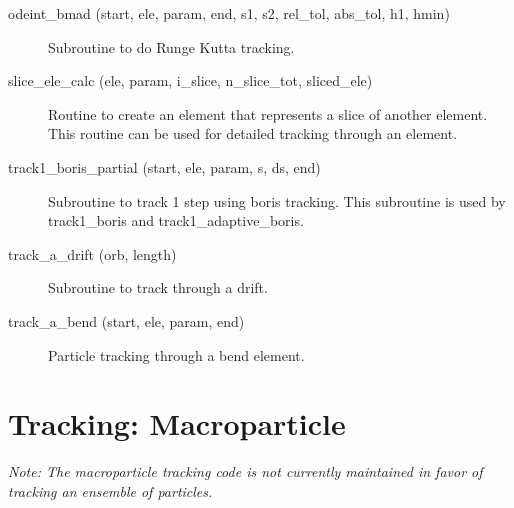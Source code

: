 \begin{description}

\label{r:odeint.bmad}
\item[odeint_bmad (start, ele, param, end, s1, s2, rel_tol, abs_tol, h1, hmin)] \Newline
Subroutine to do Runge Kutta tracking. 

\label{r:slice.ele.calc}
\item[slice_ele_calc (ele, param, i_slice, n_slice_tot, sliced_ele)] \Newline 
Routine to create an element that represents a slice of another element.
This routine can be used for detailed tracking through an element.

\label{r:track1.boris.partial}
\item[track1_boris_partial (start, ele, param, s, ds, end)] \Newline
Subroutine to track 1 step using boris tracking. 
This subroutine is used by track1_boris and track1_adaptive_boris. 

\label{r:track.a.drift}
\item[track_a_drift (orb, length)] \Newline
Subroutine to track through a drift. 

\label{r:track.a.bend}
\item[track_a_bend (start, ele, param, end)] \Newline
Particle tracking through a bend element. 

\end{description}

\section{Tracking: Macroparticle}
\label{r:macro}    

{\em Note: The macroparticle tracking code is not currently maintained
in favor of tracking an ensemble of particles.}

